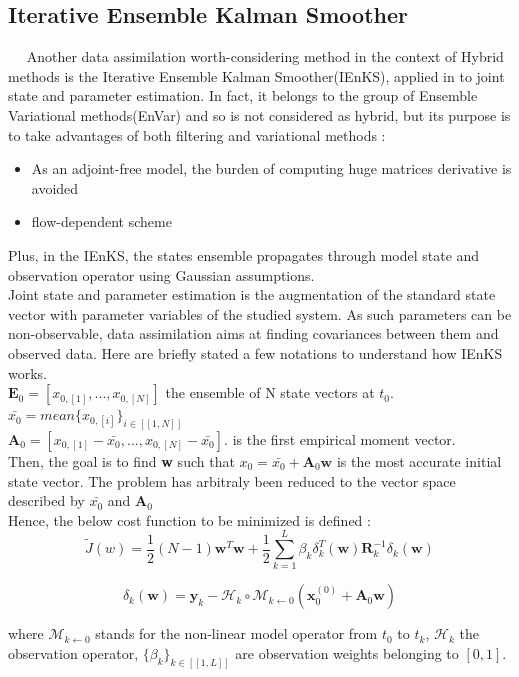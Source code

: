 \documentclass[a4,12pt]{article}
\numberwithin{equation}{section}
\begin{document}
\subsection{Iterative Ensemble Kalman Smoother}
~~ Another data assimilation worth-considering method in the context of Hybrid methods is the Iterative Ensemble Kalman Smoother(IEnKS), applied in \cite{jointState} to joint state and parameter estimation. In fact, it belongs to the group of Ensemble Variational methods(EnVar) and so is not considered as hybrid, but its purpose is to take advantages of both filtering and variational methods :
\begin{itemize}
\item As an adjoint-free model, the burden of computing huge matrices derivative is avoided
\item flow-dependent scheme
\end{itemize}
Plus, in the IEnKS, the states ensemble propagates through model state and observation operator using Gaussian assumptions. \\
Joint state and parameter estimation is the augmentation of the standard state vector with parameter variables of the studied system. As such parameters can be non-observable, data assimilation aims at finding covariances between them and observed data.
Here are briefly stated a few notations to understand how IEnKS works. \\
$\textbf{E}_0 = [x_{0,[1]},...,x_{0,[N]}]$ the ensemble of N state vectors at $t_0$. \\
$\bar{x_0} = mean\{x_{0,[i]}\}_{i \in [\![1,N]\!] }$ \\
$\textbf{A}_0 = [x_{0,[1]} - \bar{x_0},...,x_{0,[N]}- \bar{x_0}]$. is the first empirical moment vector.\\
Then, the goal is to find \textbf{w} such that $x_0 = \bar{x_0} + \textbf{A}_0 \textbf{w}$ is the most accurate initial state vector. The problem has arbitraly been reduced to the vector space described by $\bar{x_0}$ and $\textbf{A}_0$ \\
Hence, the below cost function to be minimized is defined : 
$$\tilde{J}(w) = \frac{1}{2}(N-1)\textbf{w}^{T}\textbf{w} + \frac{1}{2}\sum_{k=1}^{L}\beta_{k}\delta_{k}^{T}(\textbf{w})\textbf{R}_{k}^{-1}\delta_{k}(\textbf{w})$$

$$\delta_{k}(\textbf{w}) = \textbf{y}_{k} - \mathcal{H}_{k}\circ \mathcal{M}_{k\leftarrow 0}(\textbf{x}_{0}^{(0)} + \textbf{A}_{0}\textbf{w})$$

where $\mathcal{M}_{k\leftarrow 0}$ stands for the non-linear model operator from $t_{0}$ to $t_{k}$, $\mathcal{H}_{k}$ the observation operator, $\{\beta_k\}_{k \in [\![1,L]\!]}$ are observation weights belonging to $[0,1]$. 
\end{document}
